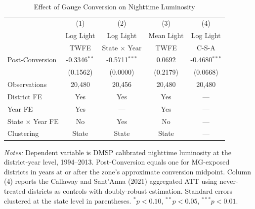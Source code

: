\begin{table}[htbp]
\centering
\begin{threeparttable}
\caption{Effect of Gauge Conversion on Nighttime Luminosity}
\label{tab:main}
\begin{tabular}{lcccc}
\hline\hline
 & (1) & (2) & (3) & (4) \\
 & Log Light & Log Light & Mean Light & Log Light \\
 & TWFE & State $\times$ Year & TWFE & C-S-A \\
\hline
Post-Conversion & -0.3346$^{**}$ & -0.5711$^{***}$ & 0.0692 & -0.4680$^{***}$ \\
 & (0.1562) & (0.0000) & (0.2179) & (0.0668) \\
\hline
Observations & 20,480 & 20,456 & 20,480 & 20,480 \\
District FE & Yes & Yes & Yes & --- \\
Year FE & Yes & --- & Yes & --- \\
State $\times$ Year FE & No & Yes & No & --- \\
Clustering & State & State & State & --- \\
\hline\hline
\end{tabular}
\begin{tablenotes}[flushleft]
\small
\item \textit{Notes:} Dependent variable is DMSP calibrated nighttime luminosity at the district-year level, 1994--2013. Post-Conversion equals one for MG-exposed districts in years at or after the zone's approximate conversion midpoint. Column (4) reports the Callaway and Sant'Anna (2021) aggregated ATT using never-treated districts as controls with doubly-robust estimation. Standard errors clustered at the state level in parentheses. $^{*}p<0.10$, $^{**}p<0.05$, $^{***}p<0.01$.
\end{tablenotes}
\end{threeparttable}
\end{table}


